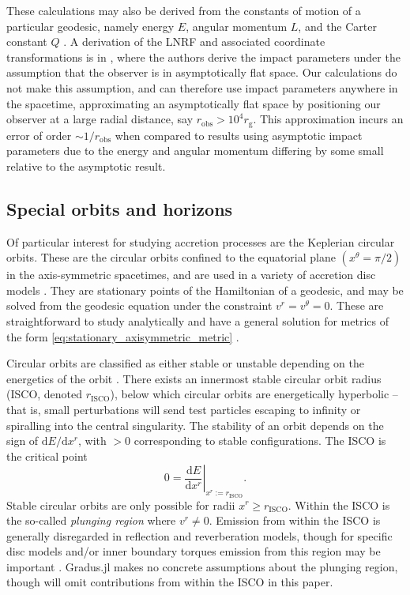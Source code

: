 \documentclass[fleqn,usenatbib]{mnras}
\newcommand{\software}[1]{{\sc #1}}
\newcommand{\Gradus}{\software{Gradus.jl}\xspace}
\renewcommand{\d}{\text{d}}
\newcommand{\rg}{r_\text{g}}
\newcommand{\risco}{r_\text{ISCO}}
\begin{document}
These calculations may also be derived from the constants of motion of a
particular geodesic, namely energy $E$, angular momentum $L$, and the Carter
constant $Q$ \citep{carter_global_1968}. A derivation of the LNRF and associated
coordinate transformations is in \citet{cunningham_optical_1973}, where the
authors derive the impact parameters under the assumption that the observer is
in asymptotically flat space. Our calculations do not make this assumption, and
can therefore use impact parameters anywhere in the spacetime, approximating an
asymptotically flat space by positioning our observer at a large radial
distance, say $r_\text{obs} > 10^4 \rg$. This approximation incurs an error of
order $\sim1/r_\text{obs}$ when compared to results using asymptotic impact
parameters due to the energy and angular momentum differing by some small
relative to the asymptotic result.

\subsection{Special orbits and horizons}
\label{sec:special-orbits}

Of particular interest for studying accretion processes are the Keplerian
circular orbits. These are the circular orbits confined to the equatorial plane $(x^\theta = \pi/2)$
in the axis-symmetric spacetimes, and are used in a variety of accretion disc models
\citep{shakura_black_1973, sadowski_relativistic_2011}. They are stationary
points of the Hamiltonian of a geodesic, and may be solved from the geodesic
equation under the constraint $v^r = v^\theta = 0$. These are straightforward to
study analytically and have a general solution for metrics of the form
\eqref{eq:stationary_axisymmetric_metric} \citep[see e.g.][and
an extension towards $a^\mu \neq 0$ in Appendix
\ref{appendix:circular-orbits}]{johannsen_regular_2013}.

Circular orbits are classified as either stable or unstable depending on the
energetics of the orbit \citep{wilkins_bound_1972,bardeen_rotating_1972}. There
exists an innermost stable circular orbit radius (ISCO, denoted $\risco$), below
which circular orbits are energetically hyperbolic -- that is, small
perturbations will send test particles escaping to infinity or spiralling into
the central singularity. The stability of an orbit depends on the sign of $\d E
/ \d x^r$, with $>0$ corresponding to stable configurations. The ISCO is the
critical point
\begin{equation}
    \label{eq:isco-definition}
    0 = \left. \frac{\d E}{\d x^r} \right\rvert_{x^r := \risco}.
\end{equation}
Stable circular orbits are only possible for radii $x^r \geq \risco$. Within the
ISCO is the so-called \textit{plunging region} where $v^r \neq 0$. Emission from
within the ISCO is generally disregarded in reflection and reverberation models,
though for specific disc models and/or inner boundary torques emission from this
region may be important \citep[see e.g.][]{reynolds_isco_1997,young_isco_1998,
mummery_continuum_2024}. \Gradus makes no concrete assumptions about the
plunging region, though will omit contributions from within the ISCO in this
paper.
\end{document}

